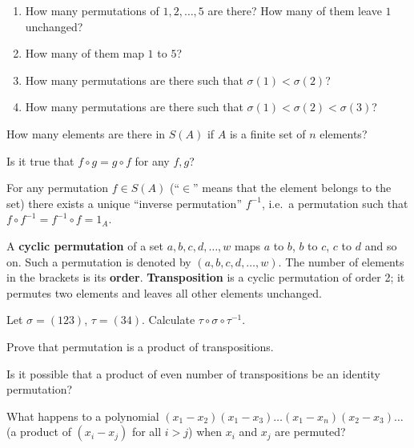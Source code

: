 \documentclass[12pt]{article}
\begin{document}
\begin{zadacha}
\begin{enumerate}
\item How many permutations of $1,2,\dots,5$ are there? How many of
  them leave $1$ unchanged?
\item How many of them map $1$ to $5$?
\item How many permutations are there such that $\sigma(1) <
  \sigma(2)$? 
\item How many permutations are there such that $\sigma(1) < \sigma(2)
  < \sigma(3)$?
\end{enumerate}
\end{zadacha}

\begin{zadacha} 
How many elements are there in $S(A)$  if $A$ is a finite set of $n$
elements?
\end{zadacha}

\begin{zadacha}  
Is it true that $f\circ g = g\circ f$ for any $f, g$?
\end{zadacha}

For any permutation $f\in S(A)$ (``$\in$'' means that the element
belongs to the set) there exists a unique ``inverse permutation''
$f^{-1}$, i.e.\ a permutation such that $f\circ f^{-1} = f^{-1}\circ f
= 1_A$.

A {\bf cyclic permutation} of a set $a,b,c,d, \dots, w$ maps $a$ to
$b$, $b$ to $c$, $c$ to $d$ and so on.  Such a permutation is denoted
by $(a,b,c,d,\dots,w)$.  The number of elements in the brackets is its
{ \bf order}. {\bf Transposition} is a cyclic permutation of order 2;
it permutes two elements and leaves all other elements unchanged.

\begin{zadacha}
Let $\sigma = (123)$, $\tau=(34)$. Calculate $\tau \circ \sigma \circ
\tau^{-1}$.
\end{zadacha}

\begin{zadacha}
Prove that permutation is a product of transpositions.
\end{zadacha}

\begin{zadacha}[*] Is it possible that a product of even number of
  transpositions be an identity permutation?
\end{zadacha}

\begin{ukazanie} What happens to a polynomial 
$(x_1-x_2)(x_1-x_3)\dots(x_1-x_n)(x_2-x_3)\dots$ (a product of $(x_i -
x_j)$ for all $i > j$) when  $x_i$ and $x_j$ are permuted?
\end{ukazanie}
\end{document}
